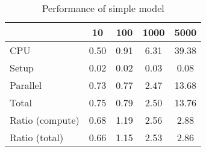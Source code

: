 \begin{table}[!h]
\centering
\caption{Performance of simple model}
\begin{tabular}{l*{4}{c}}\hline
& 10 &             100 &            1000 &            5000 \\ \hline
CPU &     0.50 &      0.91 &      6.31 &     39.38 \\
Setup &     0.02 &      0.02 &      0.03 &      0.08 \\
Parallel &     0.73 &      0.77 &      2.47 &     13.68 \\
Total &     0.75 &      0.79 &      2.50 &     13.76 \\
Ratio (compute) &     0.68 &      1.19 &      2.56 &      2.88 \\
Ratio (total) &     0.66 &      1.15 &      2.53 &      2.86 \\
\hline
\end{tabular}
\end{table}

